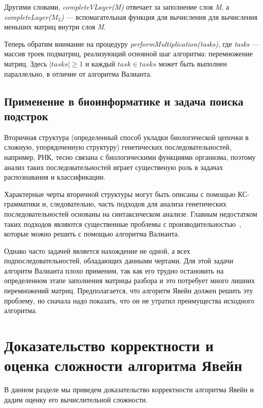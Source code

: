 Другими словами, \textit{completeVLayer(M)} отвечает за заполнение слоя \textit{M}, а \textit{completeLayer($M_{2}$)} --- вспомагательная функция для вычисления для вычисления меньших матриц внутри слоя \textit{M}.

Теперь обратим внимание на процедуру \textit{performMultiplication(tasks)}, где \textit{tasks} --- массив троек подматриц, реализующий основной шаг алгоритма: перемножение матриц.
Здесь $|tasks| \ge 1$ и каждый $task \in tasks$ может быть выполнен параллельно, в отличие от алгоритма Валианта.

\subsection{Применение в биоинформатике и задача поиска подстрок}

Вторичная структура (определенный способ укладки биологической цепочки в сложную, упорядоченную структуру) генетических последовательностей, например, РНК, тесно связана с биологическими функциями организма, поэтому анализ таких последовательностей играет существеную роль в задачах распознавания и классификации.

Характерные черты вторичной структуры могут быть описаны с помощью КС-грамматики и, следовательно, часть подходов для анализа генетических последовательностей основаны на синтаксическом анализе. Главным недостатком таких подходов являются существенные проблемы с производительностью~\cite{durbin1996biological}, которые можно решить с помощью алгоритма Валианта.

Однако часто задачей является нахождение не одной, а всех подпоследовательностей, обладающих данными чертами. Для этой задачи алгоритм Валианта плохо применим,  так как его трудно остановить на определенном этапе заполнения матрицы разбора и это потребует много лишних перемножений матриц.
Предполагается, что алгоритм Явейн должен решить эту проблему, но сначала надо показать, что он не утратил преимущества исходного алгоритма.

\section{Доказательство корректности и оценка сложности алгоритма Явейн}

В данном разделе мы приведем доказательство корректности алгоритма Явейн и дадим оценку его вычислительной сложности.

